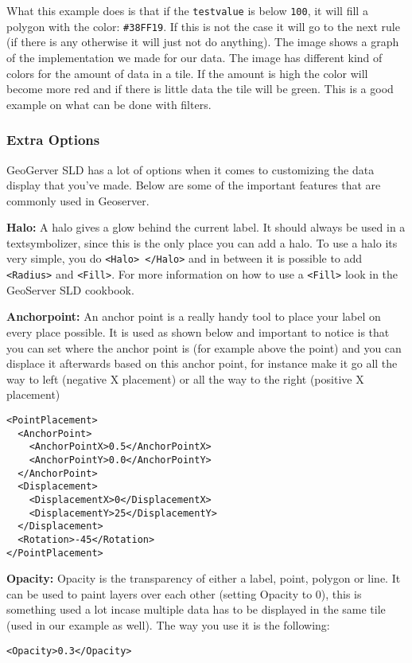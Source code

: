 What this example does is that if the \lstinline|testvalue| is below \lstinline|100|, it will fill a polygon with the color: \lstinline|#38FF19|. If this is not the case it will go to the next rule (if there is any otherwise it will just not do anything). The image shows a graph of the implementation we made for our data. The image has different kind of colors for the amount of data in a tile. If the amount is high the color will become more red and if there is little data the tile will be green. This is a good example on what can be done with filters.

\subsubsection{Extra Options}

GeoGerver SLD has a lot of options when it comes to customizing the data display that you've made. Below are some of the important features that are commonly used in Geoserver.

\textbf{Halo:} A halo gives a glow behind the current label. It should always be used in a textsymbolizer, since this is the only place you can add a halo. To use a halo its very simple, you do \lstinline|<Halo> </Halo>| and in between it is possible to add \lstinline|<Radius>| and \lstinline|<Fill>|. For more information on how to use a \lstinline|<Fill>| look in the GeoServer SLD cookbook.

\textbf{Anchorpoint:} An anchor point is a really handy tool to place your label on every place possible. It is used as shown below and important to notice is that you can set where the anchor point is (for example above the point) and you can displace it afterwards based on this anchor point, for instance make it go all the way to left (negative X placement) or all the way to the right (positive X placement)
\begin{lstlisting}
<PointPlacement>
  <AnchorPoint>
    <AnchorPointX>0.5</AnchorPointX>
    <AnchorPointY>0.0</AnchorPointY>
  </AnchorPoint>
  <Displacement>
    <DisplacementX>0</DisplacementX>
    <DisplacementY>25</DisplacementY>
  </Displacement>
  <Rotation>-45</Rotation>
</PointPlacement>
\end{lstlisting}

\textbf{Opacity:} Opacity is the transparency of either a label, point, polygon or line. It can be used to paint layers over each other (setting Opacity to 0), this is something used a lot incase multiple data has to be displayed in the same tile (used in our example as well). The way you use it is the following:
\begin{lstlisting}
<Opacity>0.3</Opacity>
\end{lstlisting}

